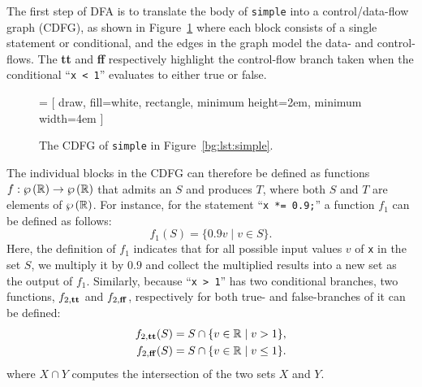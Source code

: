 The first step of DFA is to translate the body of \verb|simple| into a
control/data-flow graph (CDFG), as shown in Figure~\ref{bg:fig:cdfg} where
each block consists of a single statement or conditional, and the edges in
the graph model the data- and control-flows.  The \textbf{tt} and \textbf{ff}
respectively highlight the control-flow branch taken when the conditional
\mbox{``\texttt{x < 1}''} evaluates to either true or false.
\begin{figure}[ht]
    \centering
     = [
        draw,
        fill=white,
        rectangle,
        minimum height=2em,
        minimum width=4em
    ]
    \caption{%
        The CDFG of \texttt{simple} in Figure~\ref{bg:lst:simple}.
    }\label{bg:fig:cdfg}
\end{figure}

The individual blocks in the CDFG can therefore be defined as functions $f:
\wp\left({\mathbb{R}}\right) \to \wp\left({\mathbb{R}}\right)$ that admits an $S$ and produces
$T$, where both $S$ and $T$ are elements of $\wp\left({\mathbb{R}}\right)$.  For
instance, for the statement ``\texttt{x *= 0.9;}'' a function $f_1$ can be
defined as follows:
\begin{equation}
    f_1(S) = \{ 0.9 v \mid v \in S \}.
\end{equation}
Here, the definition of $f_1$ indicates that for all possible input values
$v$ of \verb|x| in the set $S$, we multiply it by $0.9$ and collect the
multiplied results into a new set as the output of $f_1$.  Similarly, because
\mbox{``\texttt{x > 1}''} has two conditional branches, two functions,
$f_{2,\mathbf{tt}}$ and $f_{2, \mathbf{ff}}$, respectively for both true- and
false-branches of it can be defined:
\begin{equation}
    \begin{aligned}
        f_{2, \mathbf{tt}}(S) &= S \cap \{ v \in \mathbb{R} \mid v > 1 \}, \\
        f_{2, \mathbf{ff}}(S) &= S \cap \{ v \in \mathbb{R} \mid v \leq 1 \}.
    \end{aligned}
\end{equation}
where $X \cap Y$ computes the intersection of the two sets $X$ and $Y$.

